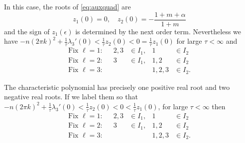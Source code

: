 \documentclass[a4paper,11pt]{article}
\theoremstyle{remark}
\begin{document}
 In this case, the roots of \eqref{eq:auxquad} are 
$$ z_1(0)=0, \quad z_2(0) = -\frac{1+m+\alpha}{1+m}$$
and the sign of $z_1(\epsilon)$ is determined by the next order term. Nevertheless we have 
$-n(2\pi k)^2 + \frac{1}{\tau}\lambda_3'(0)<\frac{1}{\tau}z_2(0)<0=\frac{1}{\tau}z_1(0)$ for large $\tau<\infty$ and
\begin{align*}
  \text{Fix $\ell=1$:}&& 2,3&\in I_1, & 1&\in I_2\\
  \text{Fix $\ell=2$:}&& 3&\in I_1, & 1,2&\in I_2\\
  \text{Fix $\ell=3$:}&& & & 1,2,3&\in I_2.
\end{align*}

The characteristic polynomial has precisely one positive real root and two negative real roots. If we label them so that
$-n(2\pi k)^2 + \frac{1}{\tau}\lambda_3'(0)<\frac{1}{\tau}z_2(0)<0<\frac{1}{\tau}z_1(0)$, for large $\tau<\infty$ then
\begin{align*}
  \text{Fix $\ell=1$:}&& 2,3&\in I_1, & 1&\in I_2\\
  \text{Fix $\ell=2$:}&& 3&\in I_1, & 1,2&\in I_2\\
  \text{Fix $\ell=3$:}&& & & 1,2,3&\in I_2.
\end{align*}
\end{document}
